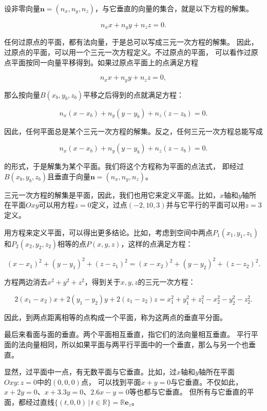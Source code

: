 \documentclass[12pt,UTF8]{ctexbook}
\begin{document}
设非零向量$\mathbf{n} = (n_x, n_y, n_z)$，与它垂直的向量的集合，就是以下方程的解集。

$$ n_xx + n_yy + n_zz = 0. $$

任何过原点的平面，都有法向量，于是总可以写成三元一次方程的解集。
因此，过原点的平面，可以用一个三元一次方程定义。不过原点的平面，
可以看作过原点平面按同一向量平移得到。如果过原点平面上的点满足方程

$$ n_xx + n_yy + n_zz = 0, $$

那么按向量$B(x_b, y_b,z_b)$平移之后得到的点就满足方程：

$$ n_x(x - x_b) + n_y(y - y_b) + n_z(z - z_b) = 0. $$

因此，任何平面总是某个三元一次方程的解集。反之，任何三元一次方程总能写成

$$ n_x(x - x_b) + n_y(y - y_b) + n_z(z - z_b) = 0. $$

的形式，于是解集为某个平面。我们将这个方程称为平面的点法式，
即经过$B(x_b, y_b,z_b)$且垂直于向量$\mathbf{n} = (n_x, n_y, n_z)$。

三元一次方程的解集是平面，因此，我们也用它来定义平面。比如，$x$轴和$y$轴所在平面$Oxy$可以用方程$z = 0$定义，过点$(-2,10,3)$并与它平行的平面可以用$z = 3$定义。	

用方程来定义平面，可以得出更多结论。比如，考虑到空间中两点$P_1(x_1, y_1, z_1)$和$P_2(x_2, y_2, z_2)$相等的点$P(x,y,z)$，这样的点满足方程：

$$ (x - x_1)^2 + (y - y_1)^2 + (z - z_1)^2 = (x - x_2)^2 + (y - y_2)^2 + (z - z_2)^2. $$

方程两边消去$x^2 + y^2 + z^2$，得到关于$x,y,z$的三元一次方程：

$$ 2(x_1-x_2)x + 2(y_1-y_2)y + 2(z_1-z_2)z = x_1^2+y_1^2+z_1^2 - x_2^2-y_2^2-z_2^2. $$

因此，到两点距离相等的点构成一个平面，称为这两点的垂直平分面。

最后来看面与面的垂直。两个平面相互垂直，指它们的法向量相互垂直。
平行平面的法向量相同，所以如果平面与两平行平面中的一个垂直，那么与另一个也垂直。

显然，过平面中一点，有无数平面与它垂直。比如，过$x$轴和$y$轴所在平面$Oxy: z = 0$中的$(0,0,0)$点，
可以找到平面$x + y = 0$与它垂直。不仅如此，$x + 2y = 0$、$x + 3.3y = 0$、$2.6x - y = 0$等也都与它垂直。
但所有与它垂直的平面，都经过直线$\{(t,0,0) \, | \, t\in \mathbb{R}\} = \mathbb{R}\mathbf{e}_z$。
\end{document}
